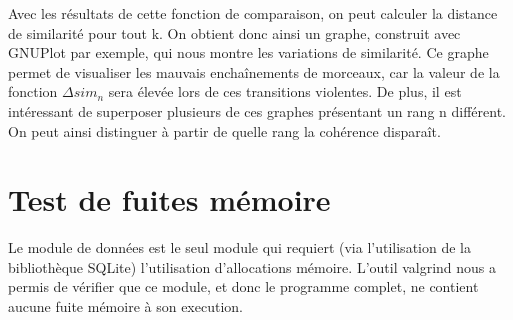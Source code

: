 Avec les résultats de cette fonction de comparaison, on peut calculer la
distance de similarité pour tout k. On obtient donc ainsi un graphe, construit
avec GNUPlot par exemple, qui nous montre les variations de similarité. Ce
graphe permet de visualiser les mauvais enchaînements de morceaux, car la valeur
de la fonction $\Delta{}sim_{n}$ sera élevée lors de ces transitions violentes.
De plus, il est intéressant de superposer plusieurs de ces graphes présentant un
rang n différent. On peut ainsi distinguer à partir de quelle rang la cohérence
disparaît.

\section{Test de fuites mémoire}
\label{tests:valgrind}

Le module de données est le seul module qui requiert (via l'utilisation de la bibliothèque SQLite) 
l'utilisation d'allocations mémoire. L'outil valgrind nous a permis de vérifier que
ce module, et donc le programme complet, ne contient aucune fuite mémoire à son execution.
